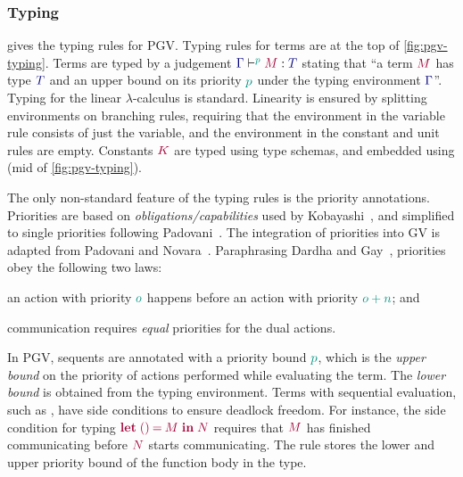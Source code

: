 \documentclass[main.tex]{subfiles}
\begin{document}
\subsubsection*{Typing}
 gives the typing rules for PGV.
Typing rules for terms are at the top of \cref{fig:pgv-typing}. Terms are typed by a judgement $\tseq[\cs{p}]{\ty{\Gamma}}{M}{T}$ stating that ``a term $\tm{M}$ has type $\ty{T}$ and an upper bound on its priority $\cs{p}$ under the typing environment $\ty{\Gamma}$''. Typing for the linear $\lambda$-calculus is standard. Linearity is ensured by splitting environments on branching rules, requiring that the environment in the variable rule consists of just the variable, and the environment in the constant and unit rules are empty. Constants $\tm{K}$ are typed using type schemas, and embedded using  (mid of \cref{fig:pgv-typing}).




The only non-standard feature of the typing rules is the priority annotations. Priorities are based on \emph{obligations/capabilities} used by Kobayashi~\cite{kobayashi06}, and simplified to single priorities following Padovani~\cite{padovani14}. The integration of priorities into GV is adapted from Padovani and Novara~\cite{padovaninovara15}. Paraphrasing Dardha and Gay~\cite{dardhagay18}, priorities obey the following two laws:
\begin{enumerate*}[label=(\roman*)]
\item an action with priority $\cs{o}$ happens before an action with priority $\cs{o+n}$; and
\item communication requires \emph{equal} priorities for the dual actions.
\end{enumerate*}

In PGV, sequents are annotated with a priority bound $\cs{p}$, which is the \emph{upper bound} on the priority of actions performed while evaluating the term. The \emph{lower bound} is obtained from the typing environment. Terms with sequential evaluation, such as , have side conditions to ensure deadlock freedom. For instance, the side condition for typing $\tm{\letunit{M}{N}}$ requires that $\tm{M}$ has finished communicating before $\tm{N}$ starts communicating. The rule  stores the lower and upper priority bound of the function body in the type.
\end{document}
